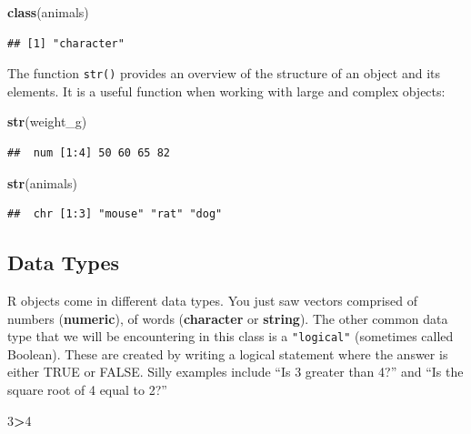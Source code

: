 \documentclass[
]{article}
\newenvironment{Shaded}{\begin{snugshade}}{\end{snugshade}}
\newcommand{\DecValTok}[1]{\textcolor[rgb]{0.00,0.00,0.81}{#1}}
\newcommand{\KeywordTok}[1]{\textcolor[rgb]{0.13,0.29,0.53}{\textbf{#1}}}
\newcommand{\NormalTok}[1]{#1}
\newcommand{\OperatorTok}[1]{\textcolor[rgb]{0.81,0.36,0.00}{\textbf{#1}}}
\begin{document}
\begin{Shaded}
\begin{Highlighting}[]
\KeywordTok{class}\NormalTok{(animals)}
\end{Highlighting}
\end{Shaded}

\begin{verbatim}
## [1] "character"
\end{verbatim}

The function \texttt{str()} provides an overview of the structure of an
object and its elements. It is a useful function when working with large
and complex objects:

\begin{Shaded}
\begin{Highlighting}[]
\KeywordTok{str}\NormalTok{(weight_g)}
\end{Highlighting}
\end{Shaded}

\begin{verbatim}
##  num [1:4] 50 60 65 82
\end{verbatim}

\begin{Shaded}
\begin{Highlighting}[]
\KeywordTok{str}\NormalTok{(animals)}
\end{Highlighting}
\end{Shaded}

\begin{verbatim}
##  chr [1:3] "mouse" "rat" "dog"
\end{verbatim}

\hypertarget{data-types}{%
\subsection{Data Types}\label{data-types}}

R objects come in different data types. You just saw vectors comprised
of numbers (\textbf{numeric}), of words (\textbf{character} or
\textbf{string}). The other common data type that we will be
encountering in this class is a \texttt{"logical"} (sometimes called
Boolean). These are created by writing a logical statement where the
answer is either TRUE or FALSE. Silly examples include ``Is 3 greater
than 4?'' and ``Is the square root of 4 equal to 2?''

\begin{Shaded}
\begin{Highlighting}[]
\DecValTok{3}\OperatorTok{>}\DecValTok{4}
\end{Highlighting}
\end{Shaded}
\end{document}
